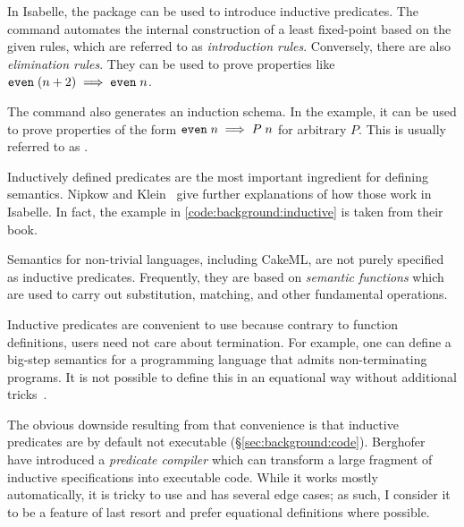 \noindent
In Isabelle, the  package can be used to introduce inductive predicates.
The  command automates the internal construction of a least fixed-point based on the given rules, which are referred to as \emph{introduction rules}.
Conversely, there are also \emph{elimination rules}.
They can be used to prove properties like $\texttt{\textup{even}}\;(n + 2) \implies \texttt{\textup{even}}\;n$.

The command also generates an induction schema.
In the  example, it can be used to prove properties of the form $\texttt{\textup{even}}\;n \implies P\;n$ for arbitrary $P$.
This is usually referred to as .

Inductively defined predicates are the most important ingredient for defining semantics.
Nipkow and Klein~\cite[§4.5]{nipkow2014semantics} give further explanations of how those work in Isabelle.
In fact, the example in \cref{code:background:inductive} is taken from their book.

Semantics for non-trivial languages, including CakeML, are not purely specified as inductive predicates.
Frequently, they are based on \emph{semantic functions} which are used to carry out substitution, matching, and other fundamental operations.

Inductive predicates are convenient to use because contrary to function definitions, users need not care about termination.
For example, one can define a big-step semantics for a programming language that admits non-terminating programs.
It is not possible to define this in an equational way without additional tricks~\cite{owens2016functional,spector2018haskell}.


\noindent
The obvious downside resulting from that convenience is that inductive predicates are by default not executable (§\ref{sec:background:code}).
Berghofer \etal~\cite{berghofer2009inductive} have introduced a \emph{predicate compiler} which can transform a large fragment of inductive specifications into executable code.
While it works mostly automatically, it is tricky to use and has several edge cases; as such, I consider it to be a feature of last resort and prefer equational definitions where possible.

